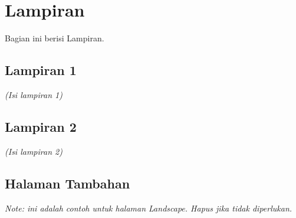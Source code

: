 \documentclass[a4paper,11pt,oneside]{report}
\newcounter{lampiran}
\begin{document}
\appendix
\chapter*{Lampiran}
Bagian ini berisi Lampiran.

\section*{Lampiran 1}
\textit{(Isi lampiran 1)}

\section*{Lampiran 2}
\textit{(Isi lampiran 2)}

\newpage
\begin{landscape}
\chapter*{Halaman Tambahan}
\noindent\textit{Note: ini adalah contoh untuk halaman Landscape. Hapus jika tidak diperlukan.}
\end{landscape}
\end{document}
